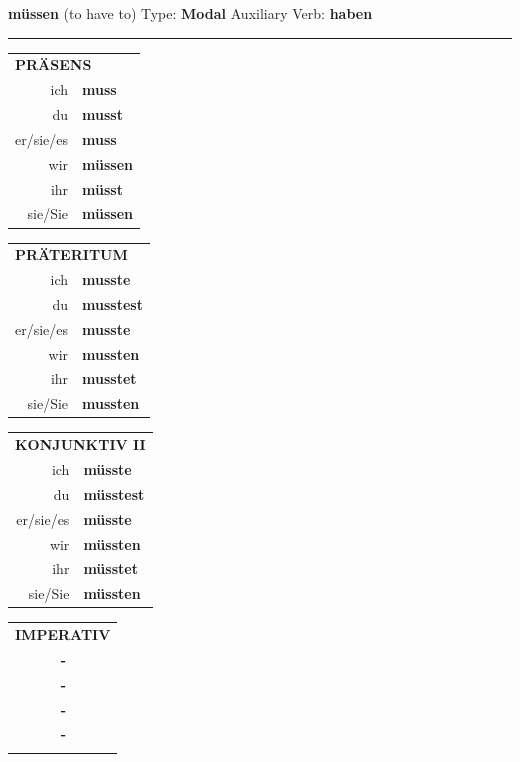 \documentclass[10pt,a4paper]{revtex4-2}
\begin{document}
\begin{verbbox-modal}
    {\Large \bf müssen} (to have to) \hfill Type: \textbf{Modal} \hfill Auxiliary Verb: \textbf{haben} 
     \vspace{5pt}
    \hrule
    \vspace{5pt}
  \begin{tabular}{rl}
     \multicolumn{2}{l}{\textbf{PRÄSENS} }\\
    ich & \textbf{muss}\\
    du & \textbf{musst}\\
    er/sie/es & \textbf{muss}\\
    wir & \textbf{müssen}\\
    ihr & \textbf{müsst}\\
    sie/Sie & \textbf{müssen}\\
  \end{tabular}
  \hfill
     \begin{tabular}{rl}
    \multicolumn{2}{l}{\textbf{PRÄTERITUM} }\\
    ich & \textbf{musste}\\
    du & \textbf{musstest}\\
    er/sie/es & \textbf{musste}\\
    wir & \textbf{mussten}\\
    ihr & \textbf{musstet}\\
    sie/Sie & \textbf{mussten}\\
  \end{tabular}
   \hfill
     \begin{tabular}{rl}
    \multicolumn{2}{l}{\textbf{KONJUNKTIV II} }\\
    ich & \textbf{müsste}\\
    du & \textbf{müsstest}\\
    er/sie/es & \textbf{müsste}\\
    wir & \textbf{müssten}\\
    ihr & \textbf{müsstet}\\
    sie/Sie & \textbf{müssten}\\
  \end{tabular}
  \hfill
  \begin{tabular}{rl}
     \multicolumn{2}{l}{\textbf{IMPERATIV} }\\
   & \textbf{-}\\
   & \textbf{-}\\
   & \textbf{-}\\
   & \textbf{-}\\
   & \vspace{10pt}
  \end{tabular}


\end{verbbox-modal}
\end{document}
